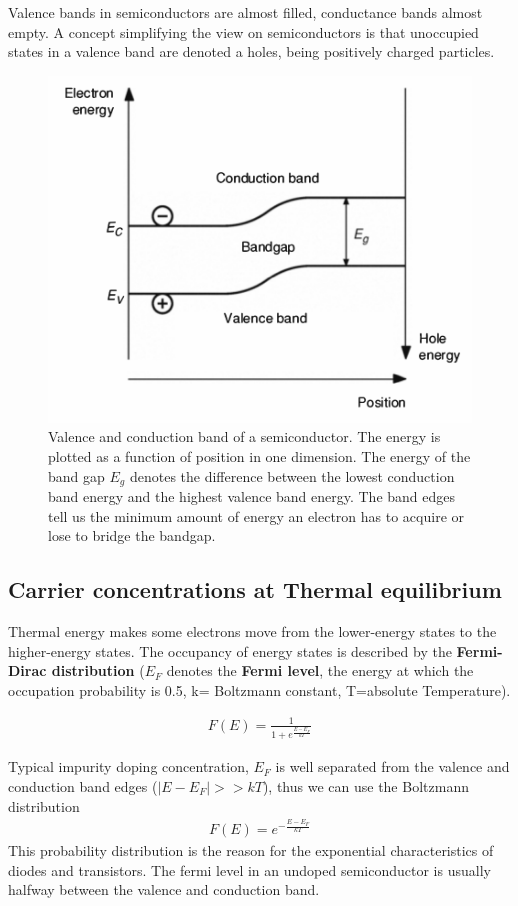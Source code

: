 \documentclass[main]{subfiles}
\begin{document}
Valence bands in semiconductors are almost filled, conductance bands almost empty. A concept simplifying the view on semiconductors is that unoccupied states in a valence band are denoted a holes, being positively charged particles.

\begin{figure}[H]
\centering
\includegraphics[scale=0.5]{pics/bandgap.png}
\caption{Valence and conduction band of a semiconductor. The energy is plotted as a function of position in one dimension. The energy of the band gap \(E_g\) denotes the difference between the lowest conduction band energy and the highest valence band energy. The band edges tell us the minimum amount of energy an electron has to acquire or lose to bridge the bandgap.}
\end{figure}

\subsection{Carrier concentrations at Thermal equilibrium}
Thermal energy makes some electrons move from the lower-energy states to the higher-energy states. The occupancy of energy states is described by the \textbf{Fermi-Dirac distribution} (\(E_F\) denotes the \textbf{Fermi level}, the energy at which the occupation probability is 0.5, k= Boltzmann constant, T=absolute Temperature).

\begin{align*}
F(E) = \frac{1}{1+e^{\frac{E-E_F}{kT}}}
\end{align*}

Typical impurity doping concentration, \(E_F\) is well separated from the valence and conduction band edges (\(|E-E_F| >> kT\)), thus we can use the Boltzmann distribution
\begin{align*}
F(E) = e^{-\frac{E-E_F}{kT}}
\end{align*}
This probability distribution is the reason for the exponential characteristics of diodes and transistors. The fermi level in an undoped semiconductor is usually halfway between the valence and conduction band.
\end{document}
